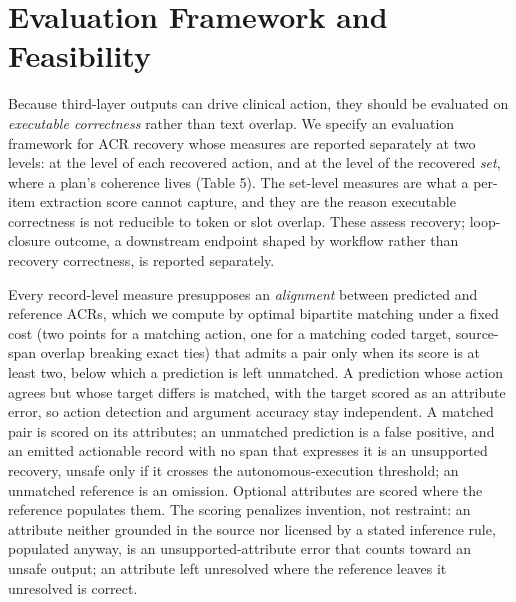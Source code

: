 \section{Evaluation Framework and Feasibility}\label{evaluation-framework-and-feasibility}

Because third-layer outputs can drive clinical action, they should be evaluated on \emph{executable correctness} rather than text overlap. We specify an evaluation framework for ACR recovery whose measures are reported separately at two levels: at the level of each recovered action, and at the level of the recovered \emph{set}, where a plan's coherence lives (Table 5). The set-level measures are what a per-item extraction score cannot capture, and they are the reason executable correctness is not reducible to token or slot overlap. These assess recovery; loop-closure outcome, a downstream endpoint shaped by workflow rather than recovery correctness, is reported separately.

Every record-level measure presupposes an \emph{alignment} between predicted and reference ACRs, which we compute by optimal bipartite matching under a fixed cost (two points for a matching action, one for a matching coded target, source-span overlap breaking exact ties) that admits a pair only when its score is at least two, below which a prediction is left unmatched. A prediction whose action agrees but whose target differs is matched, with the target scored as an attribute error, so action detection and argument accuracy stay independent. A matched pair is scored on its attributes; an unmatched prediction is a false positive, and an emitted actionable record with no span that expresses it is an unsupported recovery, unsafe only if it crosses the autonomous-execution threshold; an unmatched reference is an omission. Optional attributes are scored where the reference populates them. The scoring penalizes invention, not restraint: an attribute neither grounded in the source nor licensed by a stated inference rule, populated anyway, is an unsupported-attribute error that counts toward an unsafe output; an attribute left unresolved where the reference leaves it unresolved is correct.

